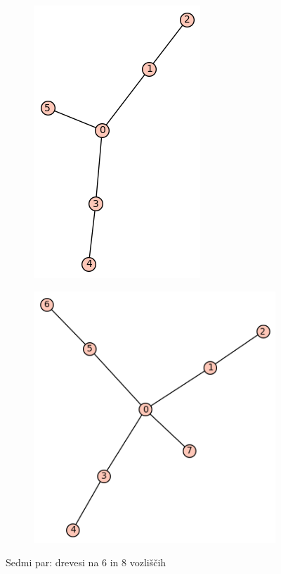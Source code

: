 \documentclass[12pt, a4paper]{article}
\begin{document}
\begin{figure}[!htb]
\centering
\begin{subfigure}{0.5\textwidth}
  \centering
  \includegraphics[width=0.35\linewidth]{t-11}
\end{subfigure}%
\begin{subfigure}{0.5\textwidth}
  \centering
  \includegraphics[width=0.5\linewidth]{t-44}
\end{subfigure}
\caption{Sedmi par: drevesi na 6 in 8 vozliščih}
\label{fig:test}
\end{figure}
\end{document}
